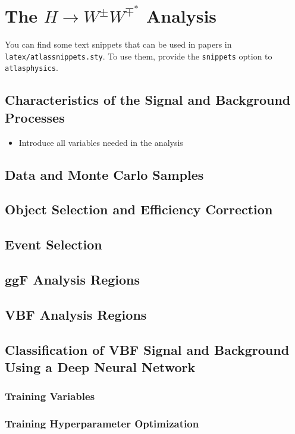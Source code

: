 \chapter{The $H\rightarrow W^{\pm}W^{\mp^*}$ Analysis}
\label{chap:hww}

You can find some text snippets that can be used in papers in \texttt{latex/atlassnippets.sty}.
To use them, provide the \texttt{snippets} option to \texttt{atlasphysics}.

\section{Characteristics of the Signal and Background Processes}
\begin{itemize}
    \item Introduce all variables needed in the analysis
\end{itemize}

\section{Data and Monte Carlo Samples}


\section{Object Selection and Efficiency Correction}

\section{Event Selection}

\section{ggF Analysis Regions}
\section{VBF Analysis Regions}

\section{Classification of VBF Signal and Background Using a Deep Neural Network}
\subsection{Training Variables}
\subsection{Training Hyperparameter Optimization}

